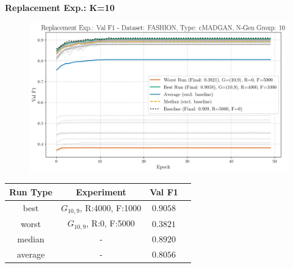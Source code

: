 \noindent\textbf{Replacement Exp.: K=10}
\begin{figure}[htbp]
	\centering
	\includegraphics[width=.85\textwidth]{abb/strat_classifier_performance/FASHION_STRATIFIED_CLASSIFIERS_cMADGAN_NEW/replacement_experiments/val_f1_score_cMADGAN_FASHION_n_gen_10_all.png}
	\label{fig:app_strat_class_performance_replacement_exp._val_f1_score_10}
\end{figure}
\begin{table}[H]
	\vspace{-1em}
	\centering
	\begin{tabular}{|c|c|c|c|}
		\hline
		Run Type & Experiment & Val F1 \\ \hline
		best & \(G_{10, 9}\), R:4000, F:1000 & $0.9058$\\ \hline
		worst & \(G_{10, 9}\), R:0, F:5000 & $0.3821$\\ \hline
		median & - & $0.8920$\\ \hline
		average & - & $0.8056$
		\\ \hline
	\end{tabular}
\end{table}
\newpage

